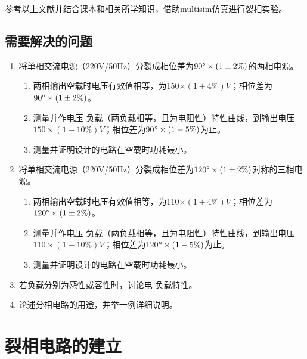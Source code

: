 \documentclass[12pt]{article}%
\begin{document}
参考以上文献并结合课本和相关所学知识，借助multisim仿真进行裂相实验。
\subsection{需要解决的问题}
\begin{enumerate}[1)]
\item 将单相交流电源（220V/50Hz）分裂成相位差为$90\degree \times (1\pm 2\%)$的两相电源。
\begin{enumerate}
\item 两相输出空载时电压有效值相等，为150$\times (1\pm 4\%)V$；相位差为$90\degree \times (1\pm 2\%)$。
\item 测量并作电压-负载（两负载相等，且为电阻性）特性曲线，到输出电压$150\times(1-10\%)V$；相位差为90$\degree\times (1-5\%)$为止。
\item 测量并证明设计的电路在空载时功耗最小。
\end{enumerate}
\item 将单相交流电源（220V/50Hz）分裂成相位差为$120\degree \times (1\pm 2\%)$对称的三相电源。
\begin{enumerate}
\item 两相输出空载时电压有效值相等，为110$\times (1\pm 4\%)V$；相位差为$120\degree \times (1\pm 2\%)$。
\item 测量并作电压-负载（两负载相等，且为电阻性）特性曲线，到输出电压$110\times (1-10\%)V$；相位差为120$\degree\times (1-5\%)$为止。
\item 测量并证明设计的电路在空载时功耗最小。
\end{enumerate}
\item 若负载分别为感性或容性时，讨论电-负载特性。
\item 论述分相电路的用途，并举一例详细说明。
\end{enumerate}
\section{裂相电路的建立}
\end{document}
